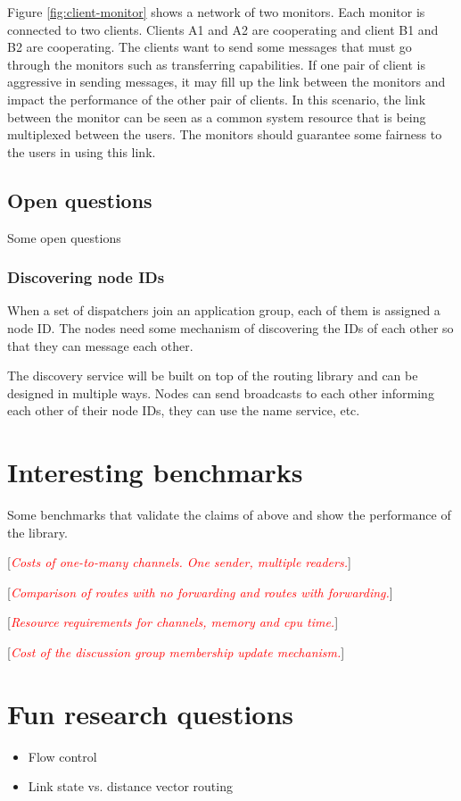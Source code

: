 \documentclass[a4paper,twoside]{report} %
\newcommand{\note}[1]{[\textcolor{red}{\textit{#1}}]}
\begin{document}
Figure \ref{fig:client-monitor} shows a network of two monitors.
Each monitor is connected to two clients.
Clients A1 and A2 are cooperating and client B1 and B2 are cooperating.
The clients want to send some messages that must go through the monitors such as
transferring capabilities.
If one pair of client is aggressive in sending messages,
it may fill up the link between the monitors and impact the performance
of the other pair of clients.
In this scenario, the link between the monitor can be seen
as a common system resource that is being multiplexed between the users.
The monitors should guarantee some fairness to the users in using this link.

\section{Open questions}
Some open questions

\subsection{Discovering node IDs}
When a set of dispatchers join an application group,
each of them is assigned a node ID.
The nodes need some mechanism of discovering the IDs of each other
so that they can message each other.

The discovery service will be built on top of the routing library
and can be designed in multiple ways.
Nodes can send broadcasts to each other informing each other of their node IDs,
they can use the name service, etc.

\chapter{Interesting benchmarks}\label{chap:benchmarks}

Some benchmarks that validate the claims of above and show the performance of the library.

\note{Costs of one-to-many channels. One sender, multiple readers.}

\note{Comparison of routes with no forwarding and routes with forwarding.}

\note{Resource requirements for channels, memory and cpu time.}

\note{Cost of the discussion group membership update mechanism.}

\chapter{Fun research questions}

\begin{itemize}
\item Flow control
\item Link state vs. distance vector routing
\end{itemize}



\end{document}
